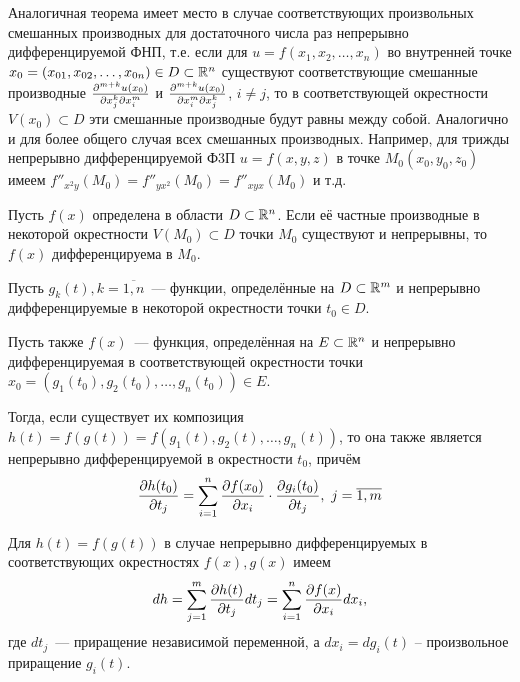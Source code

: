 \documentclass[../main.tex]{subfiles}
\begin{document}
\begin{remark}
		Аналогичная теорема имеет место в случае соответствующих 
		произвольных смешанных производных для достаточного числа 
		раз непрерывно дифференцируемой ФНП, т.е. если для 
		$u = f\left(x_1, x_2,\dots, x_n\right)$ во внутренней 
		точке $x_0 = \left(x_{01}, x_{02},\dots, x_{0n}\right)
		\in D\subset \mathbb{R}^n$ существуют соответствующие смешанные 
		производные $\frac{\partial ^{m+k}u\left(x_0\right)}{\partial x_j^k\partial x_i^m}$ и 
		$\frac{\partial ^{m+k}u\left(x_0\right)}{\partial x_i^m\partial x_j^k}$, $i\ne j$, 
		то в соответствующей окрестности $V\left(x_0\right)\subset D$ эти 
		смешанные производные будут равны между собой. Аналогично и для более 
		общего случая всех смешанных производных. Например, для трижды 
		непрерывно дифференцируемой Ф3П $u=f\left(x, y, z\right)$ в точке 
		$M_0\left(x_0, y_0, z_0\right)$ имеем
		$f''_{x^2y}\left(M_0\right) = f''_{yx^2}\left(M_0\right) = 
		f''_{xyx}\left(M_0\right)$ и т.д.
	\end{remark}
\begin{thm}
Пусть $f(x)$ определена в области $D \subset \mathbb{R}^n$. Если её
частные производные в некоторой окрестности $V(M_0)\subset D$ точки
$M_0$ существуют и непрерывны, то $f(x)$ дифференцируема в $M_0$.
\end{thm}
\begin{thm}
Пусть $g_k(t),k=\overline{1,n}$~--- функции, определённые на 
$D\subset\mathbb{R}^m$ и непрерывно дифференцируемые в некоторой окрестности 
точки $t_0\in D$.

Пусть также $f(x)$~--- функция, определённая на $E\subset\mathbb{R}^n$ и
непрерывно дифференцируемая в соответствующей окрестности точки $x_0 = 
(g_1(t_0),g_2(t_0),\dots,g_n(t_0))\in E$.

Тогда, если существует их композиция $h(t) = f(g(t)) =
f(g_1(t),g_2(t),\dots,g_n(t))$, то она также является непрерывно 
дифференцируемой в окрестности $t_0$, причём
\[\frac{\partial h(t_0)}{\partial t_j}=\sum_{i=1}^{n}
\frac{\partial f(x_0)}{\partial x_i}\cdot
\frac{\partial g_i(t_0)}{\partial t_j},\ j=\overline{1,m}\]
\end{thm}
\begin{crl}
Для $h(t) = f(g(t))$ в случае непрерывно дифференцируемых в 
соответствующих окрестностях $f(x), g(x)$ имеем
\[dh=\sum_{j=1}^m\frac{\partial h(t)}{\partial t_j}dt_j=
\sum_{i=1}^n\frac{\partial f(x)}{\partial x_i}dx_i,\]
где $dt_j$~--- приращение независимой переменной, а $dx_i=dg_i(t)$ --
произвольное приращение $g_i(t)$.
\end{crl}
\end{document}
